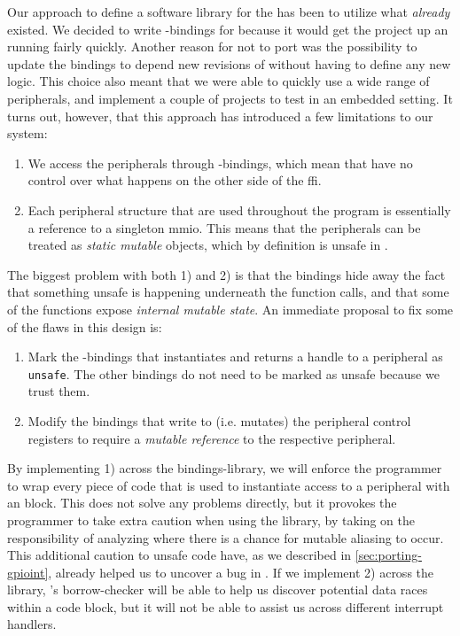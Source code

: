 Our approach to define a software library for the {\gecko} has been to utilize what \emph{already} existed.
We decided to write {\rust}-bindings for {\emlib} because it would get the project up an running fairly quickly.
Another reason for not to port {\emlib} was the possibility to update the bindings to depend new revisions of {\emlib} without having to define any new logic.
This choice also meant that we were able to quickly use a wide range of peripherals, and implement a couple of projects to test {\rust} in an embedded setting.
It turns out, however, that this approach has introduced a few limitations to our system:

\begin{enumerate}[\hspace{13}1)]
    \item We access the peripherals through {\C}-bindings, which mean that {\rust} have no control over what happens on the other side of the \gls{ffi}.

    \item Each peripheral structure that are used throughout the program is essentially a reference to a singleton \gls{mmio}.
    This means that the peripherals can be treated as \emph{static mutable} objects, which by definition is unsafe in {\rust}.

\end{enumerate}

The biggest problem with both 1) and 2) is that the bindings hide away the fact that something unsafe is happening underneath the function calls, and that some of the functions expose \emph{internal mutable state}.
An immediate proposal to fix some of the flaws in this design is:

\begin{enumerate}[\hspace{13}1)]
    \item Mark the {\rust}-bindings that instantiates and returns a handle to a peripheral as \texttt{unsafe}.
    The other bindings do not need to be marked as unsafe because we trust them.

    \item Modify the bindings that write to (i.e. mutates) the peripheral control registers to require a \emph{mutable reference} to the respective peripheral.
\end{enumerate}

By implementing 1) across the bindings-library, we will enforce the programmer to wrap every piece of code that is used to instantiate access to a peripheral with an  block.
This does not solve any problems directly, but it provokes the programmer to take extra caution when using the library, by taking on the responsibility of analyzing where there is a chance for mutable aliasing to occur.
This additional caution to unsafe code have, as we described in \autoref{sec:porting-gpioint}, already helped us to uncover a bug in .
If we implement 2) across the library, {\rust}'s borrow-checker will be able to help us discover potential data races within a code block, but it will not be able to assist us across different interrupt handlers.

